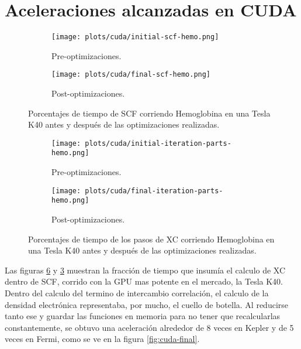 \section{Aceleraciones alcanzadas en CUDA}
\label{resultados-cuda}


\begin{figure}[htbp]
\centering
\begin{subfigure}[b]{\plotwidthtres}
   \texttt{[image: plots/cuda/initial-scf-hemo.png]}
   \caption{Pre-optimizaciones.}
   \label{fig:initial-cuda-scf}
 \end{subfigure}
 \begin{subfigure}[b]{\plotwidthtres}
   \texttt{[image: plots/cuda/final-scf-hemo.png]}
   \caption{Post-optimizaciones.}
   \label{fig:final-cuda-scf}
 \end{subfigure}
 \caption{Porcentajes de tiempo de SCF corriendo Hemoglobina en una Tesla K40 antes y despu\'es de
 las optimizaciones realizadas.}
 \label{fig:cuda-scf}
\end{figure}

\begin{figure}[htbp]
\centering
\begin{subfigure}[b]{\plotwidthtres}
   \texttt{[image: plots/cuda/initial-iteration-parts-hemo.png]}
   \caption{Pre-optimizaciones.}
   \label{fig:initial-cuda-parts}
 \end{subfigure}
 \begin{subfigure}[b]{\plotwidthtres}
   \texttt{[image: plots/cuda/final-iteration-parts-hemo.png]}
   \caption{Post-optimizaciones.}
   \label{fig:final-cuda-parts}
 \end{subfigure}
 \caption{Porcentajes de tiempo de los pasos de XC corriendo Hemoglobina en una Tesla K40 antes y despu\'es de
 las optimizaciones realizadas.}
 \label{fig:cuda-parts}
\end{figure}


Las figuras \ref{fig:cuda-parts} y \ref{fig:cuda-scf} muestran la fracci\'on de tiempo que insum\'ia el
calculo de XC dentro de SCF, corrido con la GPU mas potente en el mercado, la Tesla K40.
Dentro del calculo del termino de intercambio correlaci\'on, el calculo de la densidad electr\'onica
representaba, por mucho, el cuello de botella. Al reducirse tanto ese y guardar las funciones en
memoria para no tener que recalcularlas constantemente, se obtuvo una aceleraci\'on alrededor de 8
veces en Kepler y de 5 veces en Fermi, como se ve en la figura \ref{fig:cuda-final}.

